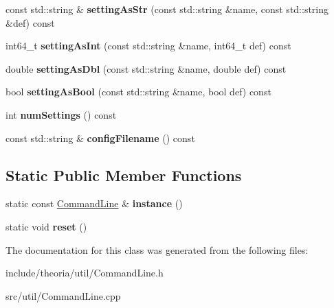 \begin{DoxyCompactItemize}
\item 
\hypertarget{classtheoria_1_1util_1_1CommandLine_a6c83c6ed1af8d9118ed1680533decafd}{const std\+::string \& {\bfseries setting\+As\+Str} (const std\+::string \&name, const std\+::string \&def) const }\label{classtheoria_1_1util_1_1CommandLine_a6c83c6ed1af8d9118ed1680533decafd}

\item 
\hypertarget{classtheoria_1_1util_1_1CommandLine_a5420c71d518a1d5a36705238cc1c6ecf}{int64\+\_\+t {\bfseries setting\+As\+Int} (const std\+::string \&name, int64\+\_\+t def) const }\label{classtheoria_1_1util_1_1CommandLine_a5420c71d518a1d5a36705238cc1c6ecf}

\item 
\hypertarget{classtheoria_1_1util_1_1CommandLine_a2d23855986a0789a064a837e4a4f695f}{double {\bfseries setting\+As\+Dbl} (const std\+::string \&name, double def) const }\label{classtheoria_1_1util_1_1CommandLine_a2d23855986a0789a064a837e4a4f695f}

\item 
\hypertarget{classtheoria_1_1util_1_1CommandLine_a1063b31088cd4baccc9289ad30663a79}{bool {\bfseries setting\+As\+Bool} (const std\+::string \&name, bool def) const }\label{classtheoria_1_1util_1_1CommandLine_a1063b31088cd4baccc9289ad30663a79}

\item 
\hypertarget{classtheoria_1_1util_1_1CommandLine_a332ac4e593ff83fb4298a4fb4d8869a6}{int {\bfseries num\+Settings} () const }\label{classtheoria_1_1util_1_1CommandLine_a332ac4e593ff83fb4298a4fb4d8869a6}

\item 
\hypertarget{classtheoria_1_1util_1_1CommandLine_af219d9ca27abe307bad2fee3ea092b8c}{const std\+::string \& {\bfseries config\+Filename} () const }\label{classtheoria_1_1util_1_1CommandLine_af219d9ca27abe307bad2fee3ea092b8c}

\end{DoxyCompactItemize}
\subsection*{Static Public Member Functions}
\begin{DoxyCompactItemize}
\item 
\hypertarget{classtheoria_1_1util_1_1CommandLine_a361f672089b8bd3cb794645ee4629b72}{static const \hyperlink{classtheoria_1_1util_1_1CommandLine}{Command\+Line} \& {\bfseries instance} ()}\label{classtheoria_1_1util_1_1CommandLine_a361f672089b8bd3cb794645ee4629b72}

\item 
\hypertarget{classtheoria_1_1util_1_1CommandLine_a1a52772e7e3b17d0dd7aa099f28c4f1e}{static void {\bfseries reset} ()}\label{classtheoria_1_1util_1_1CommandLine_a1a52772e7e3b17d0dd7aa099f28c4f1e}

\end{DoxyCompactItemize}


The documentation for this class was generated from the following files\+:\begin{DoxyCompactItemize}
\item 
include/theoria/util/Command\+Line.\+h\item 
src/util/Command\+Line.\+cpp\end{DoxyCompactItemize}
